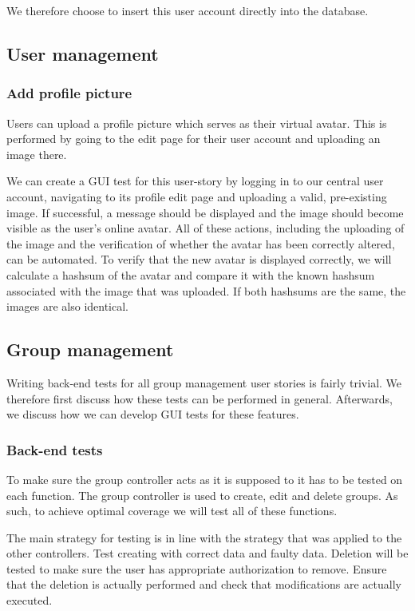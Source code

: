 \documentclass[10pt,a4paper,BCOR12mm, headexclude, footexclude,
  twoside, openright]{scrartcl}
\numberwithin{equation}{section} %
\numberwithin{figure}{section} %
\numberwithin{table}{section} %
\begin{document}
We therefore choose to insert this user account directly into the database.

\subsection{User management}

\subsubsection*{Add profile picture}

Users can upload a profile picture which serves as their virtual avatar. This is performed by going to the edit page for their user account and uploading an image there.

We can create a GUI test for this user-story by logging in to our central user account, navigating to its profile edit page and uploading a valid, pre-existing image. If successful, a message should be displayed and the image should become visible as the user's online avatar.
All of these actions, including the uploading of the image and the verification of whether the avatar has been correctly altered, can be automated.
To verify that the new avatar is displayed correctly, we will calculate a hashsum of the avatar and compare it with the known hashsum associated with the image that was uploaded.
If both hashsums are the same, the images are also identical.

\subsection{Group management}

Writing back-end tests for all group management user stories is fairly trivial.
We therefore first discuss how these tests can be performed in general. Afterwards, we discuss how we can develop GUI tests for these features.

\subsubsection*{Back-end tests}
To make sure the group controller acts as it is supposed to it has to be tested on each function.
The group controller is used to create, edit and delete groups. As such, to achieve optimal coverage we will test all of these functions. 

The main strategy for testing is in line with the strategy that was applied to the other controllers. Test creating with correct data and faulty data. Deletion will be tested to make sure the user has appropriate authorization to remove.
Ensure that the deletion is actually performed and check that modifications are actually executed.
\end{document}
